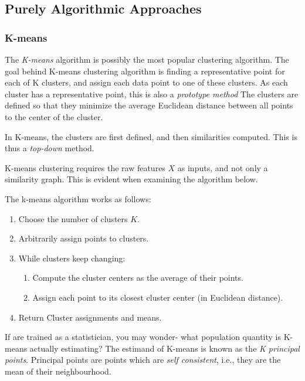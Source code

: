 \documentclass[]{book}
\providecommand{\tightlist}{%
  \setlength{\itemsep}{0pt}\setlength{\parskip}{0pt}}
\theoremstyle{definition}
\theoremstyle{definition}
\theoremstyle{remark}
\let\BeginKnitrBlock\begin \let\EndKnitrBlock\end
\begin{document}
\subsection{Purely Algorithmic
Approaches}\label{purely-algorithmic-approaches-1}

\subsubsection{K-means}\label{k-means}

The \emph{K-means} algorithm is possibly the most popular clustering
algorithm. The goal behind K-means clustering algorithm is finding a
representative point for each of K clusters, and assign each data point
to one of these clusters. As each cluster has a representative point,
this is also a \emph{prototype method} The clusters are defined so that
they minimize the average Euclidean distance between all points to the
center of the cluster.

In K-means, the clusters are first defined, and then similarities
computed. This is thus a \emph{top-down} method.

K-means clustering requires the raw features \(X\) as inputs, and not
only a similarity graph. This is evident when examining the algorithm
below.

The k-means algorithm works as follows:

\begin{enumerate}
\def\labelenumi{\arabic{enumi}.}
\tightlist
\item
  Choose the number of clusters \(K\).
\item
  Arbitrarily assign points to clusters.
\item
  While clusters keep changing:

  \begin{enumerate}
  \def\labelenumii{\arabic{enumii}.}
  \tightlist
  \item
    Compute the cluster centers as the average of their points.
  \item
    Assign each point to its closest cluster center (in Euclidean
    distance).
  \end{enumerate}
\item
  Return Cluster assignments and means.
\end{enumerate}

\BeginKnitrBlock{remark}
If are trained as a statistician, you may
wonder- what population quantity is K-means actually estimating? The
estimand of K-means is known as the \emph{K principal points}. Principal
points are points which are \emph{self consistent}, i.e., they are the
mean of their neighbourhood.
\EndKnitrBlock{remark}
\end{document}
